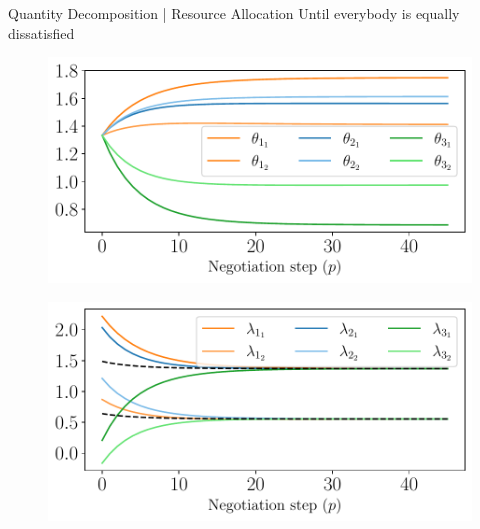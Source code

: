 \documentclass[aspectratio=169]{beamer}
\begin{document}
\begin{frame}{Quantity Decomposition | Resource Allocation}
  \centering
  Until everybody is equally dissatisfied

  \begin{minipage}{0.45\textwidth}
    \begin{figure}
      \includegraphics[width=\textwidth]{../img/example_primal_decomposition/example_theta.pdf}
    \end{figure}
  \end{minipage}
  \hfill
  \begin{minipage}{0.45\textwidth}
    \begin{figure}
      \centering
      \includegraphics[width=\textwidth]{../img/example_primal_decomposition/example_lambda.pdf}
    \end{figure}
  \end{minipage}
\end{frame}
\end{document}
